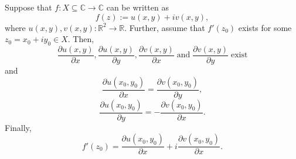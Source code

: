\documentclass[12pt]{book}
\begin{document}
\begin{thm}
    Suppose that $f: X \subseteq \mathbb{C} \rightarrow \mathbb{C}$ can be written as 
    $$
        f(z) := u(x, y) + iv(x, y),
    $$
    where $u(x, y), v(x, y): \mathbb{R}^{2} \rightarrow \mathbb{R}.$ Further, assume that $f'(z_0)$ exists for some $z_0 = x_0 + iy_0 \in X.$ Then, 
    $$
        \frac{\partial u(x, y)}{\partial x}, \frac{\partial u(x, y)}{\partial y}, \frac{\partial v(x, y)}{\partial x}\; \text{and}\; \frac{\partial v(x, y)}{\partial y}\; \text{exist}
    $$
    and 
    $$
        \frac{\partial u(x_0, y_0)}{\partial x} = \frac{\partial v(x_0, y_0)}{\partial y},
    $$
    $$
        \frac{\partial u(x_0, y_0)}{\partial y} = -\frac{\partial v(x_0, y_0)}{\partial x}.
    $$
    Finally, 
    $$
        f'(z_0) = \frac{\partial u(x_0, y_0)}{\partial x} + i\frac{\partial v(x_0, y_0)}{\partial x}.
    $$
\end{thm}
\end{document}
